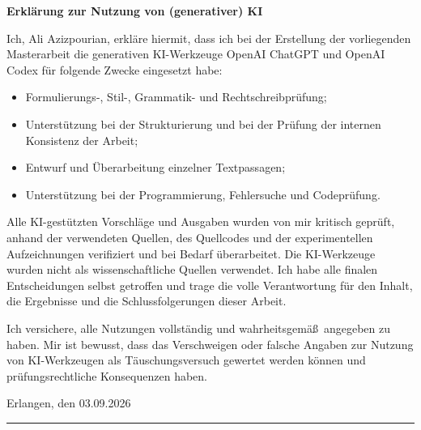 \thispagestyle{empty}

\begin{center}
  \bfseries
  Erkl\"arung zur Nutzung von (generativer) KI
\end{center}

\medskip
\noindent
Ich, Ali Azizpourian, erkl\"are hiermit, dass ich bei der Erstellung der
vorliegenden Masterarbeit die generativen KI-Werkzeuge OpenAI ChatGPT und
OpenAI Codex f\"ur folgende Zwecke eingesetzt habe:

\begin{itemize}[leftmargin=2em]
  \item Formulierungs-, Stil-, Grammatik- und Rechtschreibpr\"ufung;
  \item Unterst\"utzung bei der Strukturierung und bei der Pr\"ufung der
        internen Konsistenz der Arbeit;
  \item Entwurf und \"Uberarbeitung einzelner Textpassagen;
  \item Unterst\"utzung bei der Programmierung, Fehlersuche und Codepr\"ufung.
\end{itemize}

\noindent
Alle KI-gest\"utzten Vorschl\"age und Ausgaben wurden von mir kritisch
gepr\"uft, anhand der verwendeten Quellen, des Quellcodes und der
experimentellen Aufzeichnungen verifiziert und bei Bedarf \"uberarbeitet.
Die KI-Werkzeuge wurden nicht als wissenschaftliche Quellen verwendet. Ich
habe alle finalen Entscheidungen selbst getroffen und trage die volle
Verantwortung f\"ur den Inhalt, die Ergebnisse und die Schlussfolgerungen
dieser Arbeit.

\medskip
\noindent
Ich versichere, alle Nutzungen vollst\"andig und wahrheitsgem\"a\ss\ angegeben
zu haben. Mir ist bewusst, dass das Verschweigen oder falsche Angaben zur
Nutzung von KI-Werkzeugen als T\"auschungsversuch gewertet werden k\"onnen und
pr\"ufungsrechtliche Konsequenzen haben.

\vfill
\noindent
Erlangen, den 03.09.2026 \hfill \rule{6cm}{0.4pt}

\noindent
\hfill {}
